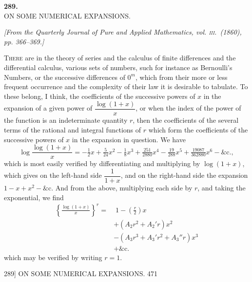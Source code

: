 \documentclass[11pt]{article}
\begin{document}
\bigskip

\begin{center}
\textbf{\large 289.}\\[1ex]
\textsc{ON SOME NUMERICAL EXPANSIONS.}
\end{center}

\begin{center}
\textit{[From the Quarterly Journal of Pure and Applied Mathematics, vol. \textsc{iii}.\ (1860),
pp. 366--369.]}
\end{center}

\medskip

\textsc{There} are in the theory of series and the calculus of finite differences and the
differential calculus, various sets of numbers, such for instance as Bernoulli's Numbers,
or the successive differences of $0^{m}$, which from their more or less frequent occurrence
and the complexity of their law it is desirable to tabulate. To these belong, I think,
the coefficients of the successive powers of $x$ in the expansion of a given power of
$\dfrac{\log(1+x)}{x}$, or when the index of the power of the function is an indeterminate
quantity $r$, then the coefficients of the several terms of the rational and integral
functions of $r$ which form the coefficients of the successive powers of $x$ in the
expansion in question. We have
\[ \log\frac{\log(1+x)}{x}=-\tfrac{1}{2}x+\tfrac{5}{24}x^{2}-\tfrac{1}{8}x^{3}+\tfrac{251}{2880}x^{4}-\tfrac{19}{288}x^{5}+\tfrac{19087}{362880}x^{6}-\&\text{c.}, \]
which is most easily verified by differentiating and multiplying by $\log(1+x)$, which
gives on the left-hand side $\dfrac{1}{1+x}$, and on the right-hand side the expansion
$1-x+x^{2}-\&\text{c.}$ And from the above, multiplying each side by $r$, and taking the
exponential, we find
\begin{align*}
\left\{\frac{\log(1+x)}{x}\right\}^{r} = & \;1-\left(\tfrac{r}{2}\right)x \\
& +\left(A_{2}r^{2}+A_{2}'r\right)x^{2} \\
& -\left(A_{3}r^{3}+A_{3}'r^{2}+A_{3}''r\right)x^{3} \\
& +\&\text{c.}
\end{align*}
which may be verified by writing $r=1$.

\begin{center}
\textsc{289]} \hfill ON SOME NUMERICAL EXPANSIONS. \hfill 471
\end{center}
\end{document}
